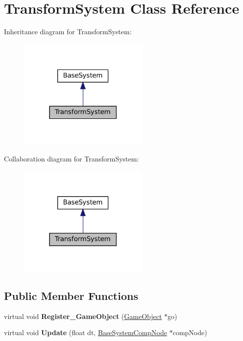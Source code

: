 \hypertarget{classTransformSystem}{}\section{Transform\+System Class Reference}
\label{classTransformSystem}


Inheritance diagram for Transform\+System\+:\nopagebreak
\begin{figure}[H]
\begin{center}
\leavevmode
\includegraphics[width=182pt]{classTransformSystem__inherit__graph}
\end{center}
\end{figure}


Collaboration diagram for Transform\+System\+:\nopagebreak
\begin{figure}[H]
\begin{center}
\leavevmode
\includegraphics[width=182pt]{classTransformSystem__coll__graph}
\end{center}
\end{figure}
\subsection*{Public Member Functions}
\begin{DoxyCompactItemize}
\item 
\mbox{\label{classTransformSystem_ab9837e5e3b2aca5c5462f93dbbd71681}} 
virtual void {\bfseries Register\+\_\+\+Game\+Object} (\hyperlink{classGameObject}{Game\+Object} $\ast$go)
\item 
\mbox{\label{classTransformSystem_a75de8bdeda1137447d575b30d16afb3b}} 
virtual void {\bfseries Update} (float dt, \hyperlink{structBaseSystemCompNode}{Base\+System\+Comp\+Node} $\ast$comp\+Node)
\end{DoxyCompactItemize}
